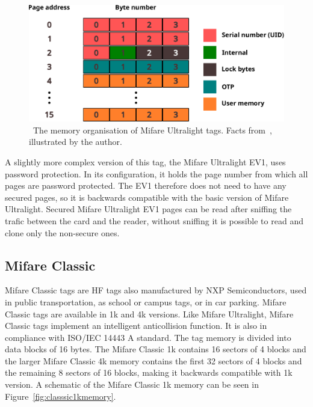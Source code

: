 \begin{figure}[ht]
  \centering
  \includegraphics[width=12cm]{text/ultralight_data.pdf}
  \caption[The memory organisation of Mifare Ultralight tags.]{~The memory organisation of Mifare Ultralight tags. Facts from~\cite{ultralightdatasheet}, illustrated by the author.}
  \label{fig:ultralightmemory}
\end{figure}

A slightly more complex version of this tag, the Mifare Ultralight EV1, uses password protection. In its configuration, it holds the page number from which all pages are password protected. The EV1 therefore does not need to have any secured pages, so it is backwards compatible with the basic version of Mifare Ultralight. Secured Mifare Ultralight EV1 pages can be read after sniffing the trafic between the card and the reader, without sniffing it is possible to read and clone only the non-secure ones.~\cite{ultralightev1datasheet, preucil2023surveying}

\subsection{Mifare Classic}

Mifare Classic tags are HF tags also manufactured by NXP Semiconductors, used in public transportation, as school or campus tags, or in car parking. Mifare Classic tags are available in 1k and 4k versions. Like Mifare Ultralight, Mifare Classic tags implement an intelligent anticollision function. It is also in compliance with ISO/IEC 14443 A standard. The tag memory is divided into data blocks of 16 bytes. The Mifare Classic 1k contains 16 sectors of 4 blocks and the larger Mifare Classic 4k memory contains the first 32 sectors of 4 blocks and the remaining 8 sectors of 16 blocks, making it backwards compatible with 1k version. A schematic of the Mifare Classic 1k memory can be seen in Figure~\ref{fig:classsic1kmemory}.~\cite{classic1kdatasheet, classic4kdatasheet}

